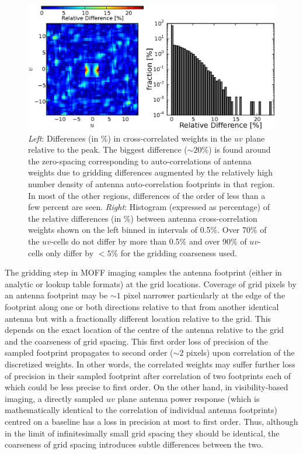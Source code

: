 \documentclass[a4paper,fleqn,usenatbib]{mnras}
\begin{document}
\begin{figure}
  \includegraphics[width=\columnwidth]{figure7}
  \caption{{\it Left}: Differences (in \%) in cross-correlated weights in the $uv$ plane relative to the peak. The biggest difference ($\sim 20$\%) is found around the zero-spacing corresponding to auto-correlations of antenna weights due to gridding differences augmented by the relatively high number density of antenna auto-correlation footprints in that region. In most of the other regions, differences of the order of less than a few percent are seen. {\it Right}: Histogram (expressed as percentage) of the relative differences (in \%) between antenna cross-correlation weights shown on the left binned in intervals of 0.5\%. Over 70\% of the $uv$-cells do not differ by more than 0.5\% and over 90\% of $uv$-cells only differ by $<5$\% for the gridding coarseness used.} 
  \label{fig:MOFF-FX-uvwts-diff}
\end{figure}

The gridding step in MOFF imaging samples the antenna footprint (either in analytic or lookup table formats) at the grid locations. Coverage of grid pixels by an antenna footprint may be $\sim 1$ pixel narrower particularly at the edge of the footprint along one or both directions relative to that from another identical antenna but with a fractionally different location relative to the grid. This depends on the exact location of the centre of the antenna relative to the grid and the coarseness of grid spacing. This first order loss of precision of the sampled footprint propagates to second order ($\sim 2$ pixels) upon correlation of the discretized weights. In other words, the correlated weights may suffer further loss of precision in their sampled footprint after correlation of two footprints each of which could be less precise to first order. On the other hand, in visibility-based imaging, a directly sampled $uv$ plane antenna power response (which is mathematically identical to the correlation of individual antenna footprints) centred on a baseline has a loss in precision at most to first order. Thus, although in the limit of infinitesimally small grid spacing they should be identical, the coarseness of grid spacing introduces subtle differences between the two.
\end{document}
